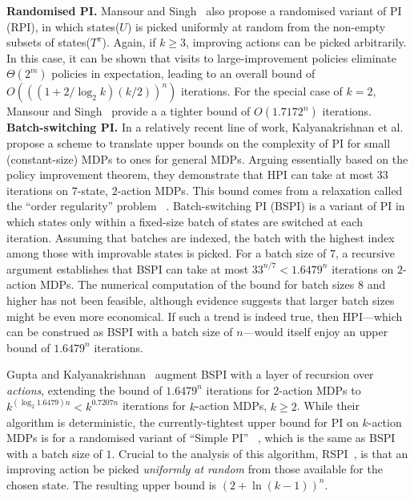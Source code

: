 \noindent\textbf{Randomised PI.} Mansour and Singh~ also propose a randomised variant of PI (RPI), in which \textsf{states}($U$) is picked uniformly at random from  the non-empty subsets of \textsf{states}($T^{\pi}$). Again, if $k \geq 3$, improving actions can be picked arbitrarily. In this case, it can be shown that visits to large-improvement policies eliminate $\Theta(2^{m})$ policies in expectation, leading to an overall bound of $O(((1 + 2/\log_{2} k )(k/2))^{n})$ iterations. For the special case of $k = 2$, Mansour and Singh~ provide a 
a tighter bound of $O(1.7172^{n})$ iterations.\\

\noindent\textbf{Batch-switching PI.} In a relatively recent line of work, Kalyanakrishnan et al.~ propose a scheme to translate upper bounds on the complexity of PI for small (constant-size) MDPs to ones for general MDPs. Arguing essentially based on the policy improvement theorem, they demonstrate that HPI can take at most $33$ iterations on $7$-state, $2$-action MDPs. This bound comes from a relaxation called the ``order regularity'' problem~ \cite{Gerencser+HDJ:2015}. Batch-switching PI (BSPI) is a variant of PI in which states only within a fixed-size batch of states are switched at each iteration. Assuming that batches are indexed, the batch with the highest index among those with improvable states is picked. For a batch size of $7$, a recursive argument establishes that BSPI can take at most $33^{n/7} < 1.6479^{n}$ iterations on $2$-action MDPs. The numerical computation of the bound for batch sizes $8$ and higher has not been feasible, although evidence suggests that larger batch sizes might be even more economical. If such a trend is indeed true, then HPI---which can be construed as BSPI with a batch size of $n$---would itself  enjoy an upper bound of $1.6479^{n}$ iterations.

Gupta and Kalyanakrishnan~ augment BSPI with a layer of recursion over \textit{actions}, extending the bound of $1.6479^{n}$ iterations for $2$-action MDPs to $k^{(\log_{2} 1.6479)n} < k^{0.7207n}$ iterations for $k$-action MDPs, $k \geq 2$. While their algorithm is deterministic, the currently-tightest upper bound for PI on $k$-action MDPs is for a randomised variant of ``Simple PI'' ~\cite{Melekopoglou+Condon:1994}, which is the same as BSPI with a batch size of $1$. Crucial to the analysis of this algorithm, RSPI~\cite{Kalyanakrishnan+MG:2016}, is that an improving action be picked \textit{uniformly at random} from those available for the chosen state. The resulting upper bound is $(2 + \ln(k - 1))^{n}$.\\

